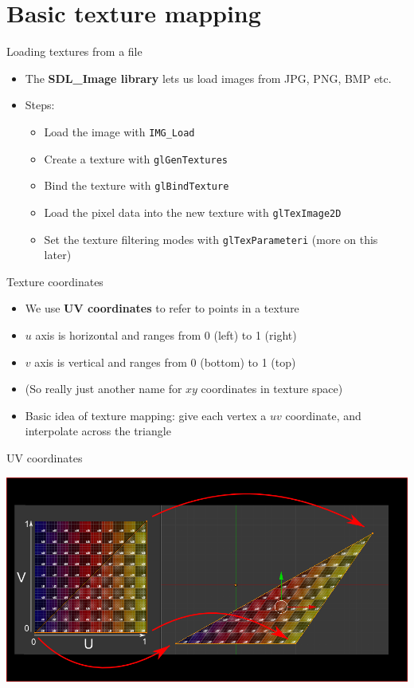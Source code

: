\part{Basic texture mapping}
\frame{\partpage}

\begin{frame}{Loading textures from a file}
	\begin{itemize}
		\item The \textbf{SDL\_Image library} lets us load images from JPG, PNG, BMP etc.
		\pause\item Steps:
			\begin{itemize}
				\pause\item Load the image with \lstinline{IMG_Load}
				\pause\item Create a texture with \lstinline{glGenTextures}
				\pause\item Bind the texture with \lstinline{glBindTexture}
				\pause\item Load the pixel data into the new texture with \lstinline{glTexImage2D}
				\pause\item Set the texture filtering modes with \lstinline{glTexParameteri} (more on this later)
			\end{itemize}
	\end{itemize}
\end{frame}

\begin{frame}{Texture coordinates}
	\begin{itemize}
		\item We use \textbf{UV coordinates} to refer to points in a texture
		\pause\item $u$ axis is horizontal and ranges from 0 (left) to 1 (right)
		\pause\item $v$ axis is vertical and ranges from 0 (bottom) to 1 (top)
		\pause\item (So really just another name for $xy$ coordinates in texture space)
		\pause\item Basic idea of texture mapping: give each vertex a $uv$ coordinate, and interpolate across the triangle
	\end{itemize}
\end{frame}

\begin{frame}{UV coordinates}
	\begin{center}
		\includegraphics[width=\textwidth]{uv}
	\end{center}
\end{frame}

